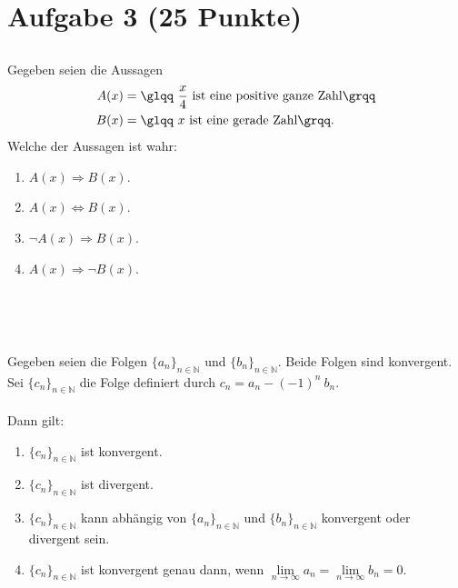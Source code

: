 \newpage
\section*{Aufgabe 3 (25 Punkte)}
\vspace{0.4cm}
\subsection*{}
Gegeben seien die Aussagen
\begin{align*}
A(x) &= \text{\glqq $\frac{x}{4}$ ist eine positive ganze Zahl\grqq}\\
B(x) &= \text{\glqq $x$ ist eine gerade Zahl\grqq}.
\end{align*}
Welche der Aussagen ist wahr:
\renewcommand{\labelenumi}{(\alph{enumi})}
\begin{enumerate}
\item $A(x) \Rightarrow B(x)$.
\item $A(x) \Leftrightarrow B(x)$.
\item $\neg A(x) \Rightarrow B(x)$.
\item $A(x) \Rightarrow \neg B(x)$.
\end{enumerate}
\ \\
\\
\subsection*{}
Gegeben seien die Folgen $\lbrace a_n \rbrace_{ n\in \mathbb{N}}$ und $\lbrace b_n\rbrace_{ n\in \mathbb{N}}$.
Beide Folgen sind konvergent.
Sei $\lbrace c_n\rbrace_{ n\in \mathbb{N}}$ die Folge definiert durch $c_n = a_n - (-1)^n \ b_n$.\\
\\
Dann gilt: 
\renewcommand{\labelenumi}{(\alph{enumi})}
\begin{enumerate}
\item $\lbrace c_n\rbrace_{ n\in \mathbb{N}}$ ist konvergent.
\item $\lbrace c_n\rbrace_{ n\in \mathbb{N}}$ ist divergent.
\item $\lbrace c_n\rbrace_{ n\in \mathbb{N}}$ kann abhängig von $\lbrace a_n\rbrace_{ n\in \mathbb{N}}$ und $\lbrace b_n\rbrace_{ n\in \mathbb{N}}$ konvergent oder divergent sein.
\item $\lbrace c_n\rbrace_{ n\in \mathbb{N}}$ ist konvergent genau dann, wenn
$ \lim \limits_{n  \rightarrow \infty} a_n = \lim \limits_{n  \rightarrow \infty} b_n = 0  $.
\end{enumerate}
\ \\
\\
